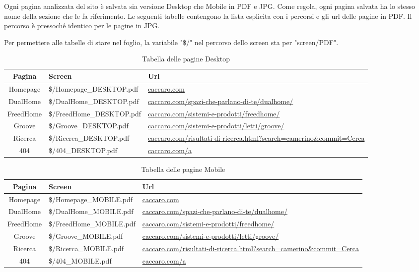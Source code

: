 Ogni pagina analizzata del sito è salvata sia versione Desktop che Mobile in PDF e JPG. Come regola, ogni pagina salvata ha lo stesso nome della sezione che le fa riferimento. Le seguenti tabelle contengono la lista esplicita con i percorsi e gli url delle pagine in PDF. Il percorso è pressoché identico per le pagine in JPG.

Per permettere alle tabelle di stare nel foglio, la variabile "\$/" nel percorso dello screen sta per "screen/PDF".

\renewcommand{\arraystretch}{1.2}
\begin{table}[H]
	\centering
\begin{tabular}{clp{5cm}}
\textbf{Pagina} & \textbf{Screen} & \textbf{Url} \\
\hline
Homepage & \$/Homepage\_DESKTOP.pdf & \url{caccaro.com} \\
DualHome & \$/DualHome\_DESKTOP.pdf & \url{caccaro.com/spazi-che-parlano-di-te/dualhome/} \\
FreedHome & \$/FreedHome\_DESKTOP.pdf & \url{caccaro.com/sistemi-e-prodotti/freedhome/} \\
Groove & \$/Groove\_DESKTOP.pdf & \url{caccaro.com/sistemi-e-prodotti/letti/groove/} \\
Ricerca & \$/Ricerca\_DESKTOP.pdf & \url{caccaro.com/risultati-di-ricerca.html?search=camerino&commit=Cerca} \\
404 & \$/404\_DESKTOP.pdf & \url{caccaro.com/a} \\
\hline
\end{tabular}
\caption{Tabella delle pagine Desktop}
\end{table}

\begin{table}[H]
	\centering
\begin{tabular}{clp{5cm}}
\textbf{Pagina} & \textbf{Screen} & \textbf{Url} \\
\hline
Homepage & \$/Homepage\_MOBILE.pdf & \url{caccaro.com} \\
DualHome & \$/DualHome\_MOBILE.pdf & \url{caccaro.com/spazi-che-parlano-di-te/dualhome/} \\
FreedHome & \$/FreedHome\_MOBILE.pdf & \url{caccaro.com/sistemi-e-prodotti/freedhome/} \\
Groove & \$/Groove\_MOBILE.pdf & \url{caccaro.com/sistemi-e-prodotti/letti/groove/} \\
Ricerca & \$/Ricerca\_MOBILE.pdf & \url{caccaro.com/risultati-di-ricerca.html?search=camerino&commit=Cerca} \\
404 & \$/404\_MOBILE.pdf & \url{caccaro.com/a} \\
\hline
\end{tabular}
\caption{Tabella delle pagine Mobile}
\end{table}

